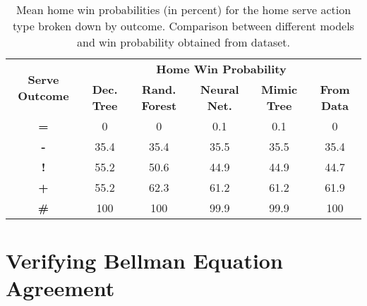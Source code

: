 \documentclass{sfuthesis}
\begin{document}
\begin{table}[]
	\centering
	\begin{tabular}{c|ccccc}
		\multirow{2}{*}{\textbf{Serve Outcome}} & \multicolumn{5}{c}{\textbf{Home Win Probability}}                                                            \\
		& \textbf{Dec. Tree} & \textbf{Rand. Forest} & \textbf{Neural Net.} & \textbf{Mimic Tree} & \textbf{From Data} \\ \hline
		\textbf{=}                              & 0                  & 0                     & 0.1                  & 0.1                 & 0                  \\
		\textbf{-}                              & 35.4               & 35.4                  & 35.5                 & 35.5                & 35.4               \\
		\textbf{!}                              & 55.2               & 50.6                  & 44.9                 & 44.9                & 44.7               \\
		\textbf{+}                              & 55.2               & 62.3                  & 61.2                 & 61.2                & 61.9               \\
		\textbf{\#}                             & 100                & 100                   & 99.9                 & 99.9                & 100               
	\end{tabular}
	\caption{Mean home win probabilities (in percent) for the home serve action type broken down by outcome. Comparison between different models and win probability obtained from dataset.}
	\label{tab:serve-values}
\end{table}

\section{Verifying Bellman Equation Agreement}
\end{document}
